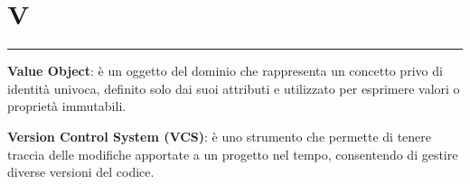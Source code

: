 \section*{V}
{\color{lightgray}\rule{\textwidth}{0.4pt}} %
\begin{glossaryitemize}
    \item \textbf{Value Object}: è un oggetto del dominio che rappresenta un concetto privo di identità univoca, definito solo dai suoi attributi e utilizzato per esprimere valori o proprietà immutabili.
    \item \textbf{Version Control System (VCS)}: è uno strumento che permette di tenere traccia delle modifiche apportate a un progetto nel tempo, consentendo di gestire diverse versioni del codice.
\end{glossaryitemize}



